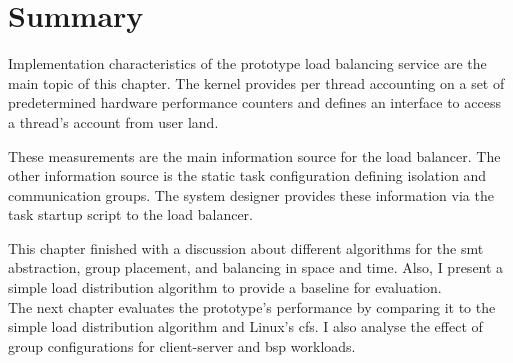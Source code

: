 \section{Summary}
\label{impl:summary}

Implementation characteristics of the prototype load balancing service are the
main topic of this chapter.
The kernel provides per thread accounting on a set of predetermined hardware
performance counters and defines an interface to access a thread's account from
user land.

These measurements are the main information source for the load balancer.
The other information source is the static task configuration defining
isolation and communication groups.
The system designer provides these information via the task startup script to
the load balancer.

This chapter finished with a discussion about different algorithms for the
\gls{smt} abstraction, group placement, and balancing in space and time.
Also, I present a simple load distribution algorithm to provide a baseline for
evaluation.
\\

The next chapter evaluates the prototype's performance by comparing it to the
simple load distribution algorithm and Linux's \gls{cfs}.
I also analyse the effect of group configurations for client-server and
\gls{bsp} workloads.
